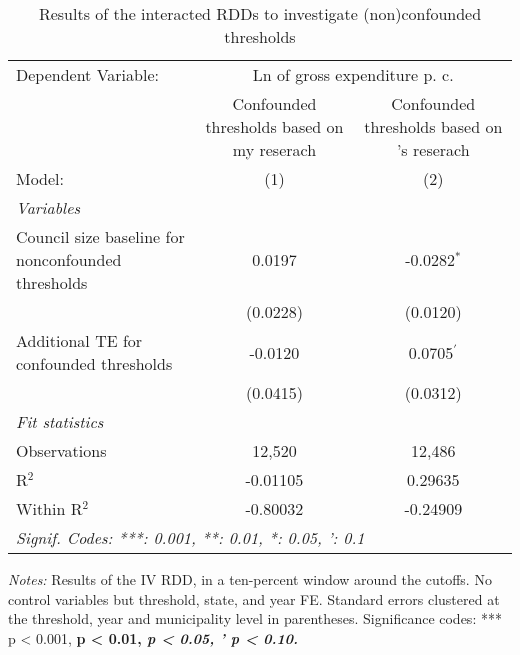 
\begin{table}[htbp]
   \caption{\label{tab:rdd_conf_thresholds} Results of the interacted \ac{RDD}s to investigate (non)confounded thresholds}
   \centering
   \begin{tabular}{lcc}
      \tabularnewline \midrule \midrule
      Dependent Variable: & \multicolumn{2}{c}{Ln of gross expenditure p. c.}\\
                                                                              & Confounded thresholds based on my reserach & Confounded thresholds based on \citeauthor{Hohmann.2017}'s \parencite*{Hohmann.2017} reserach \\     
      Model:                                                                  & (1)                                        & (2)\\  
      \midrule
      \emph{Variables}\\
      Council size baseline for nonconfounded thresholds                      & 0.0197                                     & -0.0282$^{*}$\\   
                                                                              & (0.0228)                                   & (0.0120)\\   
      Additional TE for confounded thresholds                                 & -0.0120                                    & 0.0705$^{'}$\\   
                                                                              & (0.0415)                                   & (0.0312)\\   
      \midrule
      \emph{Fit statistics}\\
      Observations                                                            & 12,520                                     & 12,486\\  
      R$^2$                                                                   & -0.01105                                   & 0.29635\\  
      Within R$^2$                                                            & -0.80032                                   & -0.24909\\  
      \midrule \midrule
      \multicolumn{3}{l}{\emph{Signif. Codes: ***: 0.001, **: 0.01, *: 0.05, ': 0.1}}\\
   \end{tabular}
   
   \par \raggedright 
   \footnotesize{\textit{Notes:} Results of the \ac{IV} \ac{RDD}, in a ten-percent window around the cutoffs. No control variables but threshold, state, and year \ac{FE}. Standard errors clustered at the threshold, year and municipality level in parentheses. Significance codes: *** p < 0.001, \textbf{ p < 0.01, \textit{ p < 0.05, ' p < 0.10.}}}
\end{table}



